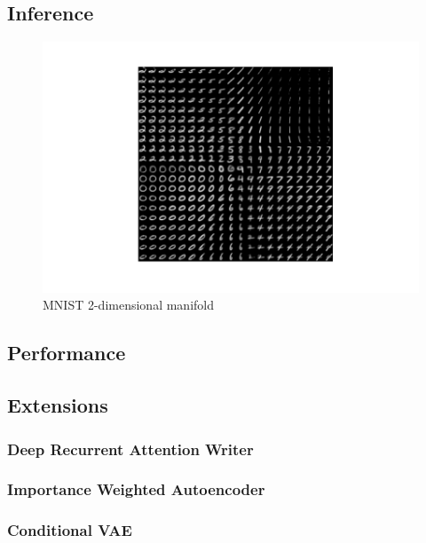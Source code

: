 \subsection{Inference}
\label{sub:vae_inference}
\begin{figure}[htb]
\centering
\includegraphics{media/manifold.pdf}
  \caption{MNIST 2-dimensional manifold}\label{fig:vae_manifold}
\end{figure}

\subsection{Performance}
\label{sub:vae_performance}

\subsection{Extensions}
\label{sub:vae_extensions}

\subsubsection{Deep Recurrent Attention Writer}
\label{ssub:vae_deep_recurrent_attention_writer}

\subsubsection{Importance Weighted Autoencoder}
\label{ssub:vae_importance_weighted_autoencoder}

\subsubsection{Conditional VAE}
\label{ssub:vae_conditional_vae}
